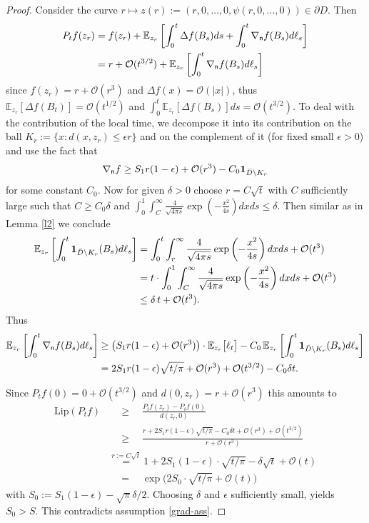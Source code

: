 \documentclass[a4paper,12pt]{article}
\theoremstyle{plain}
\begin{document}
\begin{proof}
Consider the curve $r\mapsto z(r):=(r,0,\ldots,0, \psi(r,0,\ldots,0))\in\partial D$.
Then
\begin{align*}
P_tf(z_r)&=f(z_r)+\mathbb E_{z_r}\left[\int_0^t \Delta f(B_s)ds+\int_0^t\nabla_{\sf n}f(B_s)d\ell_s\right]\\
&=r+\mathcal{O}(t^{3/2})+\mathbb E_{z_r}\left[\int_0^t \nabla_{\sf n}f(B_s)d\ell_s\right]
\end{align*}
since $f(z_r)=r+ \mathcal{O}(r^3)$ and $\Delta f(x)=\mathcal{O}(|x|)$, thus $\mathbb E_{z_r}\left[\Delta f(B_t)\right]=\mathcal{O}(t^{1/2})$ and
$\int_0^t \mathbb E_{z_r}\left[\Delta f(B_s)\right]ds=\mathcal{O}(t^{3/2})$.
To deal with the contribution of the local time, we decompose it into its contribution on the ball $K_r:=\{x: d(x,z_r)\le \epsilon r\}$ and on the complement of it (for fixed small $\epsilon>0$) and use the fact that
$$ \nabla_{\sf n}f\ge S_1r(1-\epsilon)+\mathcal{O}(r^3)- C_0{\bf 1}_{\bar D\setminus K_r}$$
for some constant $C_0$.
Now for given $\delta>0$ choose $r=C\sqrt t$ with $C$ sufficiently large such that  $C\ge C_0\delta$ and $\int_0^1 \int_{C}^\infty \frac4{\sqrt{4\pi s}}\exp(-\frac{x^2}{4s})dxds\le\delta$. Then similar as in Lemma \ref{l2} we conclude
\begin{align*}
\mathbb E_{z_r}\left[\int_0^{t} {\bf 1}_{\bar D\setminus K_r}(B_s)d\ell_s\right]&=
\int_0^t \int_{r}^\infty \frac4{\sqrt{4\pi s}}\exp\left(-\frac{x^2}{4s}\right)dxds+\mathcal{O}(t^3)\\
&= t\cdot 
\int_0^1 \int_{C}^\infty \frac4{\sqrt{4\pi s}}\exp\left(-\frac{x^2}{4s}\right)dxds+\mathcal{O}(t^3)\\&\le\delta\,t+\mathcal{O}(t^3).
\end{align*}
Thus
\begin{align*}
\mathbb E_{z_r}\left[\int_0^{t} \nabla_{\sf n}f(B_s)d\ell_s\right]&\ge \big(S_1r(1-\epsilon)+\mathcal{O}(r^3)\big)\cdot \mathbb E_{z_r}\big[\ell_{t}\big]
-C_0\, \mathbb E_{z_r}\left[\int_0^{t} {\bf 1}_{\bar D\setminus K_r}(B_s)d\ell_s\right]
\\
&= 2S_1 r(1-\epsilon)\sqrt{t/\pi}+ \mathcal{O}(r^3)+\mathcal{O}(t^{3/2})-C_0\delta t.
\end{align*}

Since $P_tf(0)=0+\mathcal{O}(t^{3/2})$ and $d(0,z_r)=r+ \mathcal{O}(r^3)$ this amounts to
\begin{align*}
\text{Lip}(P_tf)&\quad\ge\quad
\frac{P_tf(z_r)-P_tf(0)}{d(z_r,0)}\\&\quad \ge \quad
 \frac{r+2S_1 r(1-\epsilon)\sqrt{t/\pi}-C_0\delta t+\mathcal{O}(r^3)+\mathcal{O}(t^{3/2})}{r+ \mathcal{O}(r^3)}\\
&\stackrel{r:=C\sqrt t}{=}1+2S_1(1-\epsilon)\cdot \sqrt{{t}/{\pi }}-\delta\sqrt t+\mathcal{O}(t)\\
&\quad=\quad\exp\big(2S_0\cdot \sqrt{{t}/{\pi }}+\mathcal{O}(t)\big)
\end{align*}
with $S_0:=S_1(1-\epsilon)-\sqrt\pi \delta/2$. Choosing $\delta$ and $\epsilon$ sufficiently small, yields $S_0>S$.
This contradicts assumption \eqref{grad-ass}.
\end{proof}
\end{document}
